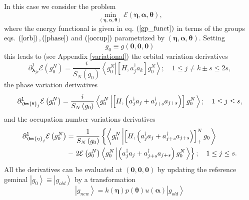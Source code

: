 \documentclass{preprint}
\begin{document}
In this case we consider the problem
\begin{equation}
\min_{\left( \bm{\eta,\alpha,\theta}\right) }\mathcal{E}\left( %
\bm{\eta,\alpha,\theta}\right) ,
\end{equation}
where the energy functional is given in eq. $\left( \ref{gp_funct}\right) $
in terms of the groups eqs. $\left( \ref{orb}\right) ,\left( \ref{phase}%
\right) $ and $\left( \ref{occup}\right) $ parametrized by $\left( %
\bm{\eta,\alpha,\theta}\right) $. Setting
\begin{equation}
g_{0}\equiv g\left( \bm{0,0,0}\right)
\end{equation}
this leads to (see Appendix \ref{variational}) the orbital variation
derivatives
\begin{equation}
\partial_{\bm{\lambda}_{jk}}^{1}\mathcal{E}\left( g_{0}^{N}\right) =\frac {i%
}{S_{N}\left( g_{0}\right) }\left\langle g_{0}^{N}\left\vert \left[
H,a_{j}^{\dagger}a_{k}\right] g_{0}^{N}\right. \right\rangle ;\quad1\leq
j\neq k\pm s\leq2s,
\end{equation}
the phase variation derivatives
\begin{equation}
\partial_{\bm{\theta}_{j}}^{1}\mathcal{E}\left( g_{0}^{N}\right) =\frac {i}{%
S_{N}\left( g_{0}\right) }\left\langle g_{0}^{N}\left\vert \left[ H,\left(
a_{j}^{\dagger}a_{j}+a_{j+s}^{\dagger}a_{j+s}\right) \right]
g_{0}^{N}\right. \right\rangle ;\quad1\leq j\leq s,
\end{equation}
and the occupation number variations derivatives
\begin{align}
\partial_{\bm{\eta}_{j}}^{1}\mathcal{E}\left( g_{0}^{N}\right) & =\frac {1}{%
S_{N}\left( g_{0}\right) }\left\{ \left\langle g_{0}^{N}\left\vert \left[
H,\left( a_{j}^{\dagger}a_{j}+a_{j+s}^{\dagger}a_{j+s}\right) \right]
_{+}^{N}g_{0}\right. \right\rangle \right.  \notag \\
& -\left. 2\mathcal{E}\left( g_{0}^{N}\right) \left\langle
g_{0}^{N}\left\vert \left(
a_{j}^{\dagger}a_{j}+a_{j+s}^{\dagger}a_{j+s}\right) g_{0}^{N}\right.
\right\rangle \right\} ;\quad1\leq j\leq s.
\end{align}
All the derivatives can be evaluated at $\left( \bm{0},\bm{0},\bm{0}\right) $
by updating the reference geminal $\left\vert g_{0}\right\rangle
\equiv\left\vert g_{old}\right\rangle $ by a transformation
\begin{equation}
\left\vert g_{new}\right\rangle =k\left( \bm{\eta}\right) p\left( \bm{\theta}%
\right) u\left( \bm{\alpha}\right) \left\vert g_{old}\right\rangle
\end{equation}
\end{document}
